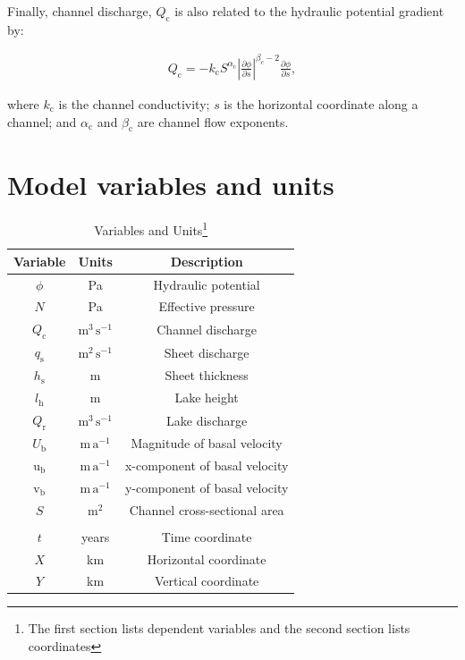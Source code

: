 \documentclass[tc, manuscript]{copernicus}
\begin{document}
Finally, channel discharge, $Q_{\mathrm{c}}$ is also related to the hydraulic potential gradient by:

\begin{equation}
\label{appeqn: Qc}
\begin{aligned}
Q_{\mathrm{c}} = -k_{\mathrm{c}}S^{\alpha_{\mathrm{c}}}\left|\frac{\partial \phi}{\partial s}\right|^{\beta_{c}-2}\frac{\partial \phi}{\partial s},
\end{aligned}
\end{equation}

where $k_{\mathrm{c}}$ is the channel conductivity; $s$ is the horizontal coordinate along a channel; and $\alpha_{\mathrm{c}}$ and $\beta_{\mathrm{c}}$ are channel flow exponents.

\newpage
\section{Model variables and units}

\begin{table}[h!]
\caption{Variables and Units\footnote{The first section lists dependent variables and the second section lists coordinates}}
 
 \label{tab:Var}
\begin{tabular}{@{}ccc}
\hline
Variable & Units & Description \\
\hline
$\phi$ & Pa & Hydraulic potential \\
$N$ & Pa & Effective pressure \\
$Q_{\mathrm{c}}$ & $\mathrm{m}^{3}\, \mathrm{s}^{-1}$ & Channel discharge \\
$q_{\mathrm{s}}$ & $\mathrm{m}^{2}\,\mathrm{s}^{-1}$ & Sheet discharge \\
$h_{\mathrm{s}}$ & m & Sheet thickness \\
$l_{\mathrm{h}}$ & m & Lake height \\
$Q_{\mathrm{r}}$ & $\mathrm{m}^{3}\, \mathrm{s}^{-1}$ & Lake discharge \\
$U_{\mathrm{b}}$ & $\mathrm{m\,a}^{-1}$ & Magnitude of basal velocity\\
$\mathrm{u}_{\mathrm{b}}$ & $\mathrm{m\,a}^{-1}$ & x-component of basal velocity \\
$\mathrm{v}_{\mathrm{b}}$ & $\mathrm{m\,a}^{-1}$ & y-component of basal velocity \\
$S$ & $\mathrm{m}^2$ & Channel cross-sectional area \\
\hfill \\
$t$ & years & Time coordinate \\
$X$ & km & Horizontal coordinate \\
$Y$ & km & Vertical coordinate \\

\hline
\end{tabular}
\end{table}
\end{document}
